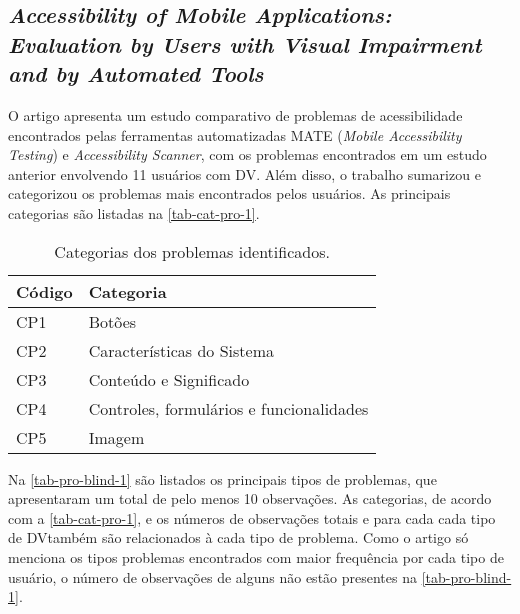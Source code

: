 \subsection{\emph{Accessibility of Mobile Applications: Evaluation by Users with Visual Impairment and by Automated Tools}}

O artigo apresenta um estudo comparativo de problemas de acessibilidade encontrados pelas ferramentas automatizadas MATE (\emph{Mobile Accessibility Testing}) e \emph{Accessibility Scanner}, com os problemas encontrados em um estudo anterior envolvendo 11 usuários com DV\@.
Além disso, o trabalho sumarizou e categorizou os problemas mais encontrados pelos usuários.
As principais categorias são listadas na \autoref{tab-cat-pro-1}.

\begin{table}[htb]
  \begin{center}
    \ABNTEXfontereduzida
    \caption{Categorias dos problemas identificados.}
    \label{tab-cat-pro-1}
    \begin{tabular}{p{2.0cm}|p{7cm}}
      \textbf{Código} & \textbf{Categoria}                       \\
      \hline
      CP1             & Botões                                   \\
      \hline
      CP2             & Características do Sistema               \\
      \hline
      CP3             & Conteúdo e Significado                   \\
      \hline
      CP4             & Controles, formulários e funcionalidades \\
      \hline
      CP5             & Imagem                                   \\
    \end{tabular}
  \end{center}
\end{table}

Na \autoref{tab-pro-blind-1} são listados os principais tipos de problemas, que apresentaram um total de pelo menos 10 observações.
As categorias, de acordo com a \autoref{tab-cat-pro-1}, e os números de observações totais e para cada cada tipo de DV\@ também são relacionados à cada tipo de problema.
Como o artigo só menciona os tipos problemas encontrados com maior frequência por cada tipo de usuário, o número de observações de alguns não estão presentes na \autoref{tab-pro-blind-1}.


